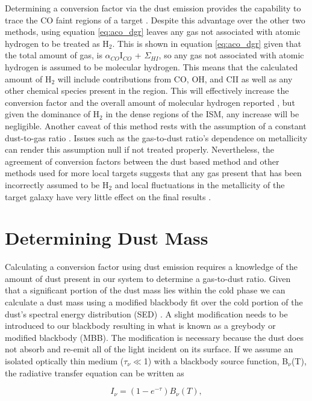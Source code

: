 Determining a conversion factor via the dust emission provides the capability to trace the CO faint regions of a target \citep{israel1997}.  Despite this advantage over the other two methods, using equation \ref{eq:aco_dgr} leaves any gas not associated with atomic hydrogen to be treated as H$_2$.  This is shown in equation \ref{eq:aco_dgr} given that the total amount of gas, is $\alpha_{CO}$I$_{CO}$ + $\Sigma_{HI}$, so any gas not associated with atomic hydrogen is assumed to be molecular hydrogen.  This means that the calculated amount of H$_2$ will include contributions from CO, OH, and CII as well as any other chemical species present in the region.  This will effectively increase the conversion factor and the overall amount of molecular hydrogen reported \citep{bolatto2013}, but given the dominance of H$_2$ in the dense regions of the ISM, any increase will be negligible.  Another caveat of this method rests with the assumption of a constant dust-to-gas ratio \citep{bolatto2013}.  Issues such as the gas-to-dust ratio's dependence on metallicity \citep{draine2007} can render this assumption null if not treated properly.  Nevertheless, the agreement of conversion factors between the dust based method and other methods used for more local targets suggests that any gas present that has been incorrectly assumed to be H$_2$ and local fluctuations in the metallicity of the target galaxy have very little effect on the final results \citep{bolatto2013}.

\section{Determining Dust Mass}

Calculating a conversion factor using dust emission requires a knowledge of the amount of dust present in our system to determine a gas-to-dust ratio.  Given that a significant portion of the dust mass lies within the cold phase we can calculate a dust mass using a modified blackbody fit over the cold portion of the dust's spectral energy distribution (SED) \citep{galametz2012}.  A slight modification needs to be introduced to our blackbody resulting in what is known as a greybody or modified blackbody (MBB).  The modification is necessary because the dust does not absorb and re-emit all of the light incident on its surface.  If we assume an isolated optically thin medium ($\tau_\nu \ll$1) with a blackbody source function, B$_\nu$(T), the radiative transfer equation can be written as 

\begin{equation}\label{eq:mbb_rad_t}
  I_\nu = \left(1-e^{-\tau}\right)B_\nu\left(T\right),
\end{equation}

